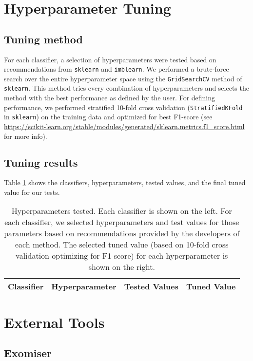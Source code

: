 \documentclass{article}
\begin{document}
\section{Hyperparameter Tuning}
\subsection{Tuning method}
For each classifier, a selection of hyperparameters were tested based on recommendations from \texttt{sklearn} and \texttt{imblearn}.  We performed a brute-force search over the entire hyperparameter space using the \texttt{GridSearchCV} method of \texttt{sklearn}.  This method tries every combination of hyperparameters and selects the method with the best performance as defined by the user.  For defining performance, we performed stratified 10-fold cross validation (\texttt{StratifiedKFold} in \texttt{sklearn}) on the training data and optimized for best F1-score (see \url{https://scikit-learn.org/stable/modules/generated/sklearn.metrics.f1_score.html} for more info).

\subsection{Tuning results}
Table \ref{tab:hyperparams} shows the classifiers, hyperparameters, tested values, and the final tuned value for our tests.

\begin{table}
\begin{tabular}{p{.3\linewidth}|p{.25\linewidth}|p{.2\linewidth}|p{.15\linewidth}}
\textbf{Classifier}&\textbf{Hyperparameter}&\textbf{Tested Values}&\textbf{Tuned Value} \\ \hline

\end{tabular}
\caption{Hyperparameters tested.  Each classifier is shown on the left.  For each classifier, we selected hyperparameters and test values for those parameters based on recommendations provided by the developers of each method.  The selected tuned value (based on 10-fold cross validation optimizing for F1 score) for each hyperparameter is shown on the right.}
\label{tab:hyperparams}
\end{table}

\section{External Tools}
\subsection{Exomiser}
\end{document}

